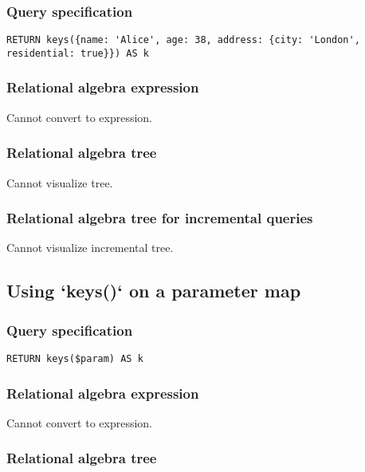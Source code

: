 \subsubsection*{Query specification}

\begin{lstlisting}
RETURN keys({name: 'Alice', age: 38, address: {city: 'London', residential: true}}) AS k
\end{lstlisting}

\subsubsection*{Relational algebra expression}

Cannot convert to expression.

\subsubsection*{Relational algebra tree}

Cannot visualize tree.

\subsubsection*{Relational algebra tree for incremental queries}

Cannot visualize incremental tree.

\subsection{Using `keys()` on a parameter map}

\subsubsection*{Query specification}

\begin{lstlisting}
RETURN keys($param) AS k
\end{lstlisting}

\subsubsection*{Relational algebra expression}

Cannot convert to expression.

\subsubsection*{Relational algebra tree}

